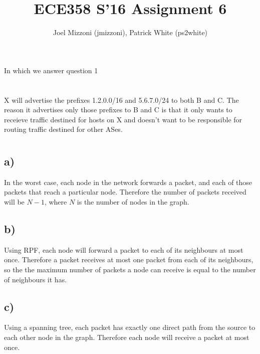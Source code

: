 \documentclass[10pt,a4paper]{article}
\author{Joel Mizzoni (jmizzoni), Patrick White (ps2white)}
\begin{document}
\title{ECE358 S'16 Assignment 6}
\maketitle
\section{}
In which we answer question 1
\section{}

X will advertise the prefixes 1.2.0.0/16 and 5.6.7.0/24 to both B and C. The reason it advertises only those prefixes to B and C is that it only wants to receieve traffic destined for hosts on X and doesn't want to be responsible for routing traffic destined for other ASes.
\section{}

\subsection{a)}
In the worst case, each node in the network forwards a packet, and each of those packets that reach a particular node. Therefore the number of packets received will be $N-1$, where $N$ is the number of nodes in the graph.

\subsection{b)}
Using RPF, each node will forward a packet to each of its neighbours at most once. Therefore a packet receives at most one packet from each of its neighbours, so the the maximum number of packets a node can receive is equal to the number of neighbours it has.

\subsection{c)}
Using a spanning tree, each packet has exactly one direct path from the source to each other node in the graph. Therefore each node will receive a packet at most once. 
\end{document}
